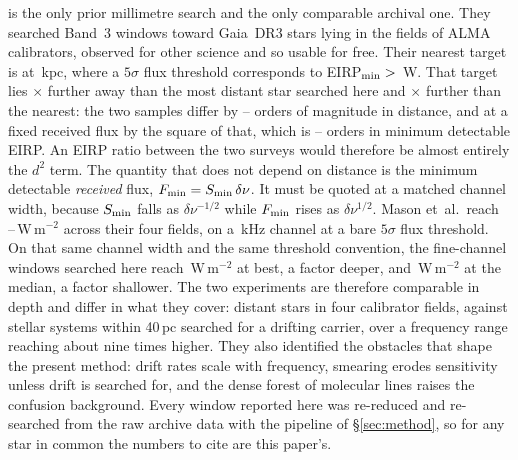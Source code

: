 \citet{Mason2025} is the only prior millimetre search and the only
comparable archival one. They searched Band~3 windows toward
\MasonNStar{} Gaia~DR3 stars lying in the fields of \MasonNCal{} ALMA
calibrators, observed for other science and so usable for free. Their
nearest target is at \MasonNearKpc\,kpc, where a $5\sigma$ flux threshold
corresponds to EIRP$_{\rm min}>{}$\MasonNearEirp\,W. That target lies
\MasonDistRatioFar$\times$ further away than the most distant star searched
here and \MasonDistRatioNear$\times$ further than the nearest: the two
samples differ by \MasonDistOrdLo--\MasonDistOrdHi{} orders of magnitude in
distance, and at a fixed received flux by the square of that, which is
\MasonEirpOrdLo--\MasonEirpOrdHi{} orders in minimum detectable EIRP. An EIRP
ratio between the two surveys would therefore be almost entirely the $d^{2}$
term. The quantity
that does not depend on distance is the minimum detectable \emph{received}
flux, $F_{\rm min}=S_{\rm min}\,\delta\nu$. It must be quoted at a matched
channel width, because $S_{\rm min}$ falls as $\delta\nu^{-1/2}$ while
$F_{\rm min}$ rises as $\delta\nu^{1/2}$. Mason
et~al.\ reach \MasonFluxLo--\MasonFluxHi\,W\,m$^{-2}$ across their four
fields, on a \MasonChanKHz\,kHz channel at a bare $5\sigma$ flux
threshold. On
that same channel width and the same threshold convention, the
fine-channel windows searched here reach \FluxMatchBest\,W\,m$^{-2}$ at
best, a factor \FluxBestRatio{} deeper, and \FluxMatchMed\,W\,m$^{-2}$ at
the median, a factor \FluxMedRatio{} shallower. The two experiments are
therefore comparable in depth and differ in what they cover: distant stars
in four calibrator fields, against \NSysClassA{} stellar systems within
40\,pc searched for a drifting carrier, over a frequency range reaching
about nine times higher. They also
identified the obstacles that shape the present method: drift rates scale
with frequency, smearing erodes sensitivity unless drift is searched for,
and the dense forest of molecular lines raises the confusion background.
Every window reported here was re-reduced and re-searched from the raw
archive data with the pipeline of \S\ref{sec:method}, so for any star in
common the numbers to cite are this paper's.

